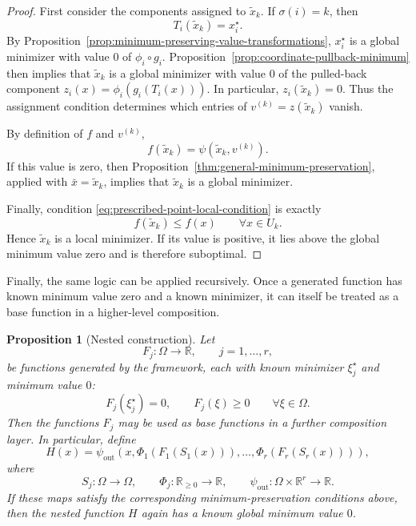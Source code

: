\documentclass[11pt,a4paper]{article}
\theoremstyle{remark}
\theoremstyle{plain}
\newtheorem{proposition}{Proposition}
\begin{document}
\begin{proof}
	First consider the components assigned to \(\tilde x_k\). If
	\(\sigma(i)=k\), then
	\[
	T_i(\tilde x_k)=x_i^\star.
	\]
	By Proposition~\ref{prop:minimum-preserving-value-transformations},
	\(x_i^\star\) is a global minimizer with value \(0\) of
	\(\phi_i\circ g_i\). Proposition~\ref{prop:coordinate-pullback-minimum}
	then implies that \(\tilde x_k\) is a global minimizer with value \(0\) of
	the pulled-back component \(z_i(x)=\phi_i(g_i(T_i(x)))\). In particular,
	\(z_i(\tilde x_k)=0\).
	Thus the assignment condition determines which entries of
	\(v^{(k)}=z(\tilde x_k)\) vanish.
	
	By definition of \(f\) and \(v^{(k)}\),
	\[
	f(\tilde x_k)=\psi(\tilde x_k,v^{(k)}).
	\]
	If this value is zero, then
	Proposition~\ref{thm:general-minimum-preservation}, applied with
	\(\bar x=\tilde x_k\), implies that \(\tilde x_k\) is a global minimizer.
	
	Finally, condition
	\eqref{eq:prescribed-point-local-condition} is exactly
	\[
	f(\tilde x_k)\le f(x)
	\qquad
	\forall x\in U_k.
	\]
	Hence \(\tilde x_k\) is a local minimizer. If its value is positive, it lies
	above the global minimum value zero and is therefore suboptimal.
\end{proof}

Finally, the same logic can be applied recursively. Once a generated function
has known minimum value zero and a known minimizer, it can itself be treated as
a base function in a higher-level composition.

\begin{proposition}[Nested construction]
	\label{prop:nested-construction}
	Let
	\[
	F_j:\Omega\to\mathbb{R},
	\qquad j=1,\ldots,r,
	\]
	be functions generated by the framework, each with known minimizer
	\(\xi_j^\star\) and minimum value \(0\):
	\[
	F_j(\xi_j^\star)=0,
	\qquad
	F_j(\xi)\ge0
	\qquad
	\forall \xi\in\Omega.
	\]
	Then the functions \(F_j\) may be used as base functions in a further
	composition layer. In particular, define
	\[
	H(x)
	=
	\psi_{\mathrm{out}}
	\left(
	x,
	\Phi_1(F_1(S_1(x))),
	\ldots,
	\Phi_r(F_r(S_r(x)))
	\right),
	\]
	where
	\[
	S_j:\Omega\to\Omega,
	\qquad
	\Phi_j:\mathbb{R}_{\ge0}\to\mathbb{R},
	\qquad
	\psi_{\mathrm{out}}:\Omega\times\mathbb{R}^r\to\mathbb{R}.
	\]
	If these maps satisfy the corresponding minimum-preservation conditions
	above, then the nested function \(H\) again has a known global minimum value
	\(0\).
\end{proposition}
\end{document}
